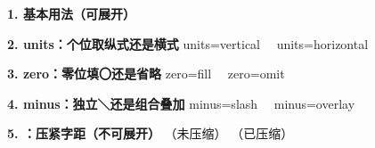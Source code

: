 \documentclass[12pt]{article}
\begin{document}
\obeylines
\textbf{1. 基本用法（可展开）}
 \quad {}

\textbf{2. units：个位取纵式还是横式}
units=vertical\ \ 
{units=horizontal }

\textbf{3. zero：零位填〇还是省略}
zero=fill\ \ 
{zero=omit\ }

\textbf{4. minus：独立＼还是组合叠加}
minus=slash\ \ 
{\JuliaFont{}minus=overlay }

\textbf{5. \string\zhrodbox：压紧字距（不可展开）}
（未压缩）
（已压缩）
\end{document}
